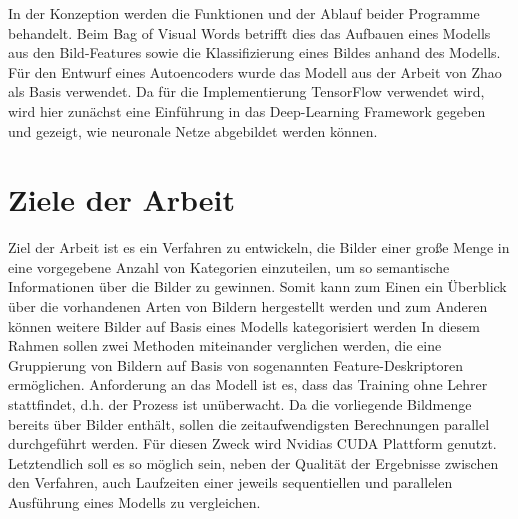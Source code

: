 In der Konzeption werden die Funktionen und der Ablauf beider Programme behandelt. Beim Bag of Visual Words betrifft dies das Aufbauen eines Modells aus den Bild-Features sowie die Klassifizierung eines Bildes anhand des Modells. Für den Entwurf eines Autoencoders wurde das Modell aus der Arbeit von Zhao \todo{[REF]} als Basis verwendet. Da für die Implementierung TensorFlow verwendet wird, wird hier zunächst eine Einführung in das Deep-Learning Framework gegeben und gezeigt, wie neuronale Netze abgebildet werden können. 

\section{Ziele der Arbeit}

Ziel der Arbeit ist es ein Verfahren zu entwickeln, die Bilder einer große Menge in eine vorgegebene Anzahl von Kategorien einzuteilen, um so semantische Informationen über die Bilder zu gewinnen. Somit kann zum Einen ein Überblick über die vorhandenen Arten von Bildern hergestellt werden und zum Anderen können weitere Bilder auf Basis eines Modells kategorisiert werden
In diesem Rahmen sollen zwei Methoden miteinander verglichen werden, die eine Gruppierung von Bildern auf Basis von sogenannten Feature-Deskriptoren ermöglichen.  
Anforderung an das Modell ist es, dass das Training ohne Lehrer stattfindet, d.h. der Prozess ist unüberwacht. Da die vorliegende Bildmenge bereits über  Bilder enthält, sollen die zeitaufwendigsten Berechnungen parallel durchgeführt werden. Für diesen Zweck wird Nvidias CUDA Plattform genutzt. Letztendlich soll es so möglich sein, neben der Qualität der Ergebnisse zwischen den Verfahren, auch Laufzeiten einer jeweils sequentiellen und parallelen Ausführung eines Modells zu vergleichen. 

